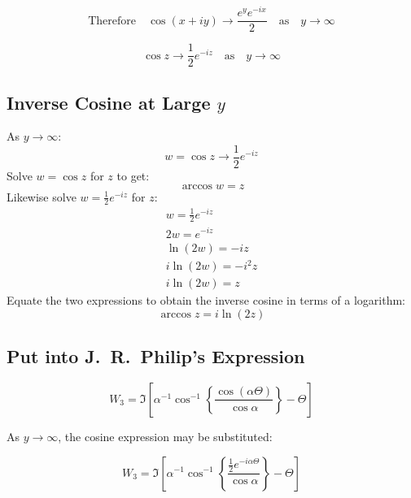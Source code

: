 \documentclass[12pt, a4paper, twoside, openright]{book}
\begin{document}
\begin{equation}
\text{Therefore} \quad \cos (x + iy) \to  \frac{e^{y} e^{-ix}}{2}
\quad \text{as} \quad y \to \infty
\end{equation}

\begin{equation}
\cos z \to \frac{1}{2} e^{-iz} \quad \text{as} \quad y \to \infty
\end{equation}


\subsection*{Inverse Cosine at Large $y$}

As $y \to \infty$:
\begin{equation}
w = \cos z \to \frac{1}{2} e^{-iz}
\end{equation}
Solve $w = \cos z$ for $z$ to get:
\begin{equation*}
\arccos w = z
\end{equation*}
Likewise solve $w = \frac{1}{2} e^{-iz}$ for $z$:
\begin{gather*}
w = \frac{1}{2} e^{-iz} \\
2 w = e^{-iz} \\
\ln (2w) = -iz \\
i \ln (2w) = -i^2 z \\
i \ln (2w) = z
\end{gather*}
Equate the two expressions to obtain the inverse cosine in terms of a logarithm:
\begin{equation}
\arccos z = i \ln(2z)
\end{equation}

\subsection*{Put into J.\ R.\ Philip's Expression}

\begin{equation}
W_{3} = \Im \left[  
 \alpha^{-1} \cos^{-1} 
 \left\{ \frac{\cos(\alpha \Theta)}{\cos \alpha} \right\} - \Theta
   \right]
\end{equation}

As $y \to \infty$, the cosine expression may be substituted:

\begin{equation}
W_{3} = \Im \left[  
 \alpha^{-1} \cos^{-1} 
 \left\{ \frac{\frac{1}{2} e^{-i \alpha \Theta}}{\cos \alpha} \right\} - \Theta
   \right]
\end{equation}
\end{document}
